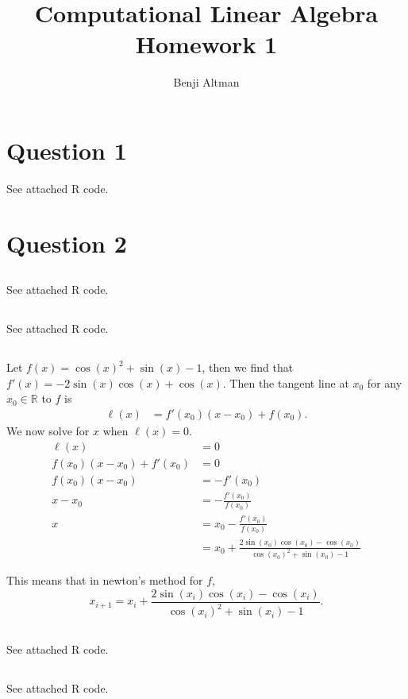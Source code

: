 \documentclass{article}
\title{Computational Linear Algebra\\ Homework 1}
\author{Benji Altman}
\begin{document}
	\maketitle
	\tableofcontents
	
	\section{Question 1}
	See attached R code.
	
	\section{Question 2}
	\subsection{}
	See attached R code.
	
	\subsection{}
	See attached R code.
	\subsection{}
	Let $f(x) = \cos(x)^2 + \sin(x) - 1$, then we find that $f'(x) = - 2\sin(x)\cos(x) + \cos(x)$. Then the tangent line at $x_0$ for any $x_0\in\mathbb R$ to $f$ is 
	\begin{align*}
	\ell(x) &= f'(x_0)(x-x_0) + f(x_0)\text{.}
	\end{align*}
	We now solve for $x$ when $\ell(x) = 0$.
	\begin{align*}
	\ell(x) &= 0 \\
	f(x_0)(x-x_0)+f'(x_0) &= 0\\
	f(x_0)(x-x_0) &= -f'(x_0) \\
	x-x_0 &= -\frac{f'(x_0)}{f(x_0)}\\
	x  &= x_0-\frac{f'(x_0)}{f(x_0)}\\
	&=x_0+\frac{2\sin(x_0)\cos(x_0)-\cos(x_0)}{\cos(x_0)^2 + \sin(x_0)-1}
	\end{align*}
	
	This means that in newton's method for $f$,
	\[
	x_{i+1} = x_i+\frac{2\sin(x_i)\cos(x_i)-\cos(x_i)}{\cos(x_i)^2 + \sin(x_i)-1}\text{.}
	\]
	\subsection{}
	See attached R code.
	\subsection{}
	See attached R code.
\end{document}
